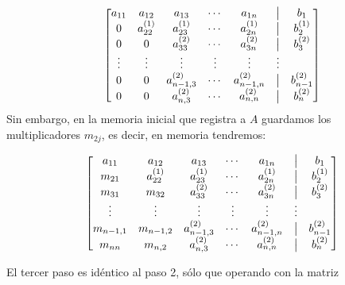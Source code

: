 \documentclass[
]{article}
\begin{document}
\begin{equation*}
\begin{array}{cc}
 &  \begin{bmatrix} 
     a_{11} & a_{12}            & a_{13}           & \cdots & a_{1n}        & \bigm| & b_1      \\ 
     0      & a^{(1)}_{22}      & a^{(1)}_{23}     & \cdots & a^{(1)}_{2n}  & \bigm| & b_2^{(1)}\\
     0      & 0                 & a^{(2)}_{33}     & \cdots & a^{(2)}_{3n}  & \bigm| & b_3^{(2)}\\
    \vdots  & \vdots            & \vdots           & \vdots & \vdots        & \vdots & \\
     0      & 0                 & a^{(2)}_{n-1,3}  & \cdots & a^{(2)}_{n-1,n}& \bigm|& b_{n-1}^{(2)}\\
     0      & 0                 & a^{(2)}_{n,3}    & \cdots & a^{(2)}_{n,n}& \bigm| & b_{n}^{(2)}\\
  \end{bmatrix}
\end{array}
\end{equation*} Sin embargo, en la memoria inicial que registra a \(A\)
guardamos los multiplicadores \(m_{2j}\), es decir, en memoria
tendremos:

\begin{equation}
\begin{array}{cc}
 &  \begin{bmatrix} 
     a_{11} & a_{12}            & a_{13}           & \cdots & a_{1n}        & \bigm| &b_1      \\ 
     m_{21} & a^{(1)}_{22}      & a^{(1)}_{23}     & \cdots & a^{(1)}_{2n}  & \bigm| &b_2^{(1)}\\
     m_{31} & m_{32}            & a^{(2)}_{33}     & \cdots & a^{(2)}_{3n}  & \bigm| &b_3^{(2)}\\
    \vdots  & \vdots            & \vdots           & \vdots & \vdots        & \vdots &\\
 m_{n-1,1}  & m_{n-1,2}         & a^{(2)}_{n-1,3}  & \cdots & a^{(2)}_{n-1,n}& \bigm| & b_{n-1}^{(2)}\\
     m_{nn} & m_{n,2}          & a^{(2)}_{n,3}    & \cdots & a^{(2)}_{n,n}& \bigm| &b_{n}^{(2)}\\
  \end{bmatrix}
\end{array}
\end{equation}

El tercer paso es idéntico al paso 2, sólo que operando con la matriz
\end{document}

